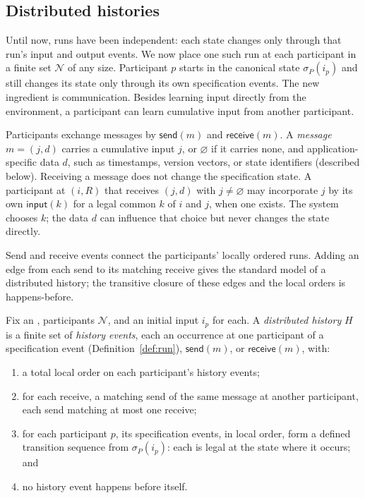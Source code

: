 
\subsection{Distributed histories}
\label{sec:histories}

Until now, runs have been independent: each state changes only through that
run's input and output events.  We now place one such run at each participant in
a finite set $\mathcal N$ of any size.  Participant $p$ starts in the canonical state
$\sigma_P(i_p)$ and still changes its state only through its own specification
events.  The new ingredient is communication.  Besides learning input directly
from the environment, a participant can learn cumulative input from another
participant.

Participants exchange messages by $\mathsf{send}(m)$ and
$\mathsf{receive}(m)$.  A \emph{message} $m=(j,d)$ carries a cumulative input $j$, or $\varnothing$ if it
carries none, and application-specific data $d$, such as timestamps, version
vectors, or state identifiers (described below).  Receiving a message does not
change the specification state.  A participant at $(i,R)$ that receives $(j,d)$ with
$j\neq\varnothing$ may incorporate $j$ by its own $\mathsf{input}(k)$ for a
legal common \indesc $k$ of $i$ and $j$, when one exists.  The system chooses $k$; the data $d$ can influence that choice but never
changes the state directly.

Send and receive events connect the participants' locally ordered runs.  Adding
an edge from each send to its matching receive gives the standard model of a
distributed history; the transitive closure of these edges and the local orders
is happens-before.

\begin{definition}
\label{def:distributed-history}
Fix an \spectype, participants $\mathcal N$, and an initial input $i_p$
for each.  A \emph{distributed history} $H$ is a finite set of
\emph{history events}, each an occurrence at one participant of a
specification event (Definition~\ref{def:run}), $\mathsf{send}(m)$, or
$\mathsf{receive}(m)$, with:
\begin{enumerate}
  \item a total local order on each participant's history events;
  \item for each receive, a matching send of the same message at another
        participant, each send matching at most one receive;
  \item for each participant $p$, its specification events, in local order,
        form a defined transition sequence from $\sigma_P(i_p)$: each
        is legal at the state where it occurs; and
    \item no history event happens before itself.
\end{enumerate}
\end{definition}


